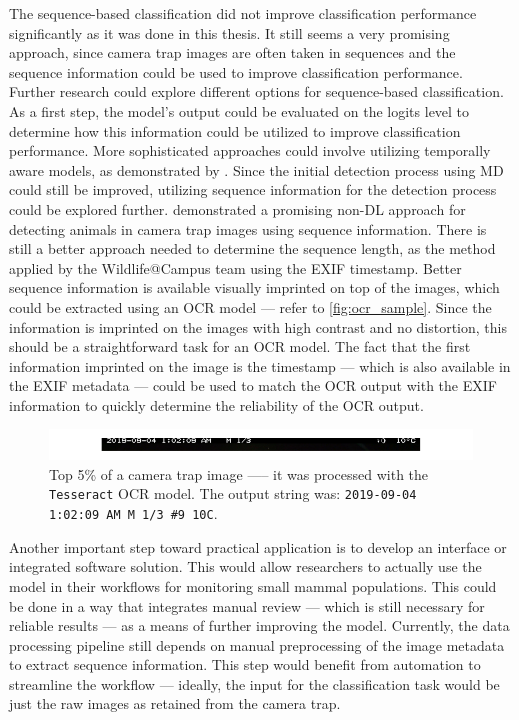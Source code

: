 The sequence-based classification did not improve classification performance significantly as it was done in this thesis.
It still seems a very promising approach, since camera trap images are often taken in sequences and the sequence information could be used to improve classification performance.
Further research could explore different options for sequence-based classification.
As a first step, the model's output could be evaluated on the logits level to determine how this information could be utilized to improve classification performance.
More sophisticated approaches could involve utilizing temporally aware models, as demonstrated by \textcite{muhammadTemporalSwinFPNNetNovel2024}.
Since the initial detection process using \ac{MD} could still be improved, utilizing sequence information for the detection process could be explored further.
\textcite{zotinANIMALDETECTIONUSING2019} demonstrated a promising non-\ac{DL} approach for detecting animals in camera trap images using sequence information.
There is still a better approach needed to determine the sequence length, as the method applied by the Wildlife@Campus team using the \ac{EXIF} timestamp.
Better sequence information is available visually imprinted on top of the images, which could be extracted using an \ac{OCR} model --- refer to \autoref{fig:ocr_sample}.
Since the information is imprinted on the images with high contrast and no distortion, this should be a straightforward task for an \ac{OCR} model.
The fact that the first information imprinted on the image is the timestamp — which is also available in the \ac{EXIF} metadata --- could be used to match the \ac{OCR} output with the \ac{EXIF} information to quickly determine the reliability of the \ac{OCR} output.

\begin{figure}[ht]
\centering
\includegraphics{figures/ocr_example.pdf}
\caption{Top 5\% of a camera trap image —-- it was processed with the \texttt{Tesseract} \acs{OCR} model. The output string was: \texttt{2019-09-04 1:02:09 AM M 1/3 \#9 10\textdegree C}.}
\label{fig:ocr_sample}
\end{figure}

Another important step toward practical application is to develop an interface or integrated software solution.
This would allow researchers to actually use the model in their workflows for monitoring small mammal populations.
This could be done in a way that integrates manual review --- which is still necessary for reliable results --- as a means of further improving the model.
Currently, the data processing pipeline still depends on manual preprocessing of the image metadata to extract sequence information.
This step would benefit from automation to streamline the workflow --- ideally, the input for the classification task would be just the raw images as retained from the camera trap.
